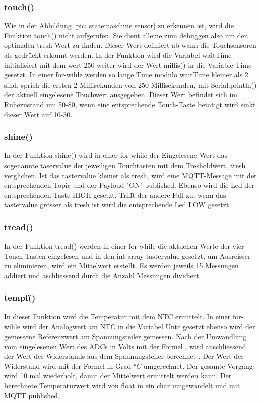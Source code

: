 \subsubsection{touch()} 
Wie in der Abbildung \ref{pic: statemaschine sensor} zu erkennen ist, wird die Funktion touch() nicht aufgerufen. Sie dient alleine zum debuggen also um den optimalen tresh Wert zu finden. Dieser Wert definiert ab wann die Touchsensoren als gedrückt erkannt werden. In der Funktion wird die Variabel waitTime initialisiert mit dem wert 250 weiter wird der Wert millis() in die Variable Time gesetzt. In einer for-wihle werden so lange Time modulo waitTime kleiner als 2 sind, sprich die ersten 2 Millisekunden von 250 Millisekunden, mit Serial.println() der aktuell eingelesene Touchwert ausgegeben. Dieser Wert befindet sich im Ruhezustand um 50-80, wenn eine entsprechende Touch-Taste betätigt wird sinkt dieser Wert auf 10-30.  
\subsubsection{shine()}
In der Funktion shine() wird in einer for-while der Eingelesene Wert das sogenannte taservalue der jeweiligen Touchtasten mit dem Tresholdwert, tresh verglichen. Ist das tastervalue kleiner als tresh, wird eine MQTT-Message mit der entsprechenden Topic und der Payloud "ON" published. Ebenso wird die Led der entsprechenden Taste HIGH gesetzt. Trifft der andere Fall zu, wenn das tastervalue grösser als tresh ist wird die entsprechende Led LOW gesetzt.
\subsubsection{tread()}
In der Funktion tread() werden in einer for-while die aktuellen Werte der vier Touch-Tasten eingelesen und in den int-array tastervalue gesetzt, um Ausreisser zu eliminieren, wird ein Mittelwert erstellt. Es werden jeweils 15 Messungen addiert und aschliessend durch die Anzahl Messungen dividiert.  
\subsubsection{tempf()}
In dieser Funktion wird die Temperatur mit dem NTC ermittelt. In einer for-wihle wird der Analogwert am NTC in die Variabel Untc gesetzt ebenso wird der gemessene Referenzwert am Spannungsteiler gemessen. Nach der Umwandlung vom eingelesenen Wert des ADCs in Volts mit der Formel , wird anschliessend der Wert des Widerstands aus dem Spannungsteiler berechnet . Der Wert des Widerstand wird mit der Formel  in Grad $°C$ umgerechnet. Der gesamte Vorgang wird 10 mal wiederholt, damit der Mittelwert ermittelt werden kann. Der berechnete Temperaturwert wird von float in ein char umgewandelt und mit MQTT published. 
\newpage

